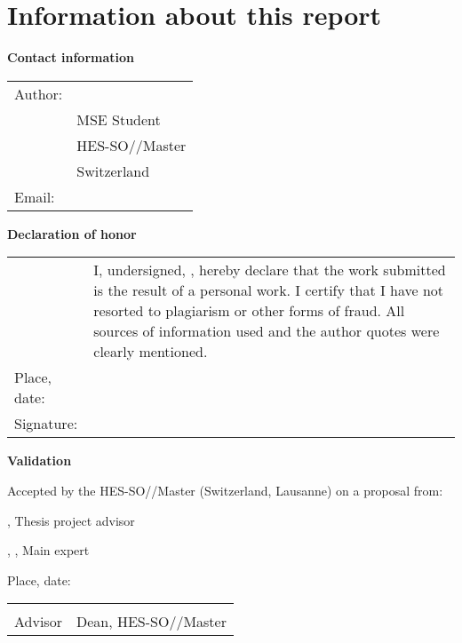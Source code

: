 \chapter*{Information about this report}

\vspace{\fill}

\textbf{Contact information}

\begin{tabularx}{\textwidth}{L{2.5cm}X}
	Author:	 & \AuthorFirstName \AuthorLastName \\
	& MSE Student \\
	& HES-SO//Master \\
	& Switzerland \\
	Email: & \email{\AuthorEmail}
\end{tabularx}

\vspace{\fill}

\textbf{Declaration of honor}

{\renewcommand{\arraystretch}{2}
\begin{tabularx}{\textwidth}{L{2.5cm}X}
	& I, undersigned, \Author, hereby declare that the work submitted is 
	the result of a personal work. I certify that I have not resorted to 
	plagiarism or other forms of fraud. All sources of information used and the 
	author quotes were clearly mentioned. \\
	Place, date: & \underline{\hspace{7cm}} \\ 
	Signature: & \underline{\hspace{7cm}}
\end{tabularx}
}

\vspace{\fill}

\textbf{Validation}

Accepted by the HES-SO//Master (Switzerland, Lausanne) on a proposal from:

\vspace{0.5cm}

\Advisor, Thesis project advisor

\Expert, \ExpertLab, Main expert

\vspace{1cm}

Place, date: \underline{\hspace{8cm}}

\vspace{3cm}

{ \renewcommand{\arraystretch}{1.5}
\begin{tabularx}{\textwidth}{X X}
	\Advisor  & \Dean\\ 
	Advisor   & Dean, HES-SO//Master\\
\end{tabularx}
}